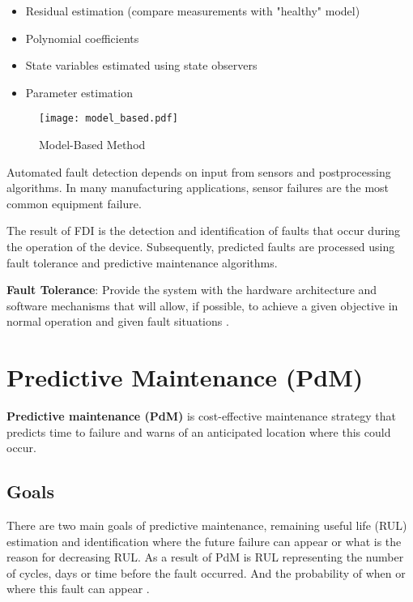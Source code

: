 \begin{itemize}
    \item Residual estimation (compare measurements with "healthy" model)
    \item Polynomial coefficients
    \item State variables estimated using state observers
    \item Parameter estimation
\end{itemize}

\begin{figure}[h!]
    \centering
    \texttt{[image: model\_based.pdf]}
    \caption{Model-Based Method}
    \label{fig:model_based}
\end{figure}


Automated fault detection depends on input from sensors and postprocessing
algorithms. In many manufacturing applications, sensor failures are the
most common equipment failure.


The result of FDI is the detection and identification of faults that occur
during the operation of the device. Subsequently, predicted faults are
processed using fault tolerance and predictive maintenance algorithms.

\textbf{Fault Tolerance}: Provide the system with the hardware architecture
and software mechanisms that will allow, if possible, to achieve a given
objective in normal operation and given fault situations \cite{fdi_cern2}.

% 


\section{Predictive Maintenance (PdM)}
\textbf{Predictive maintenance (PdM)} is cost-effective maintenance strategy that
predicts time to failure and warns of an anticipated location where this
could occur.

\subsection{Goals}
There are two main goals of predictive maintenance,  remaining useful life
(RUL) estimation and identification where the future failure can appear or
what is the reason for decreasing RUL.  As a result of PdM is RUL
representing the number of cycles, days or time before the fault occurred.
And the probability of when or where this fault can appear
\cite{matlab_full}. 

